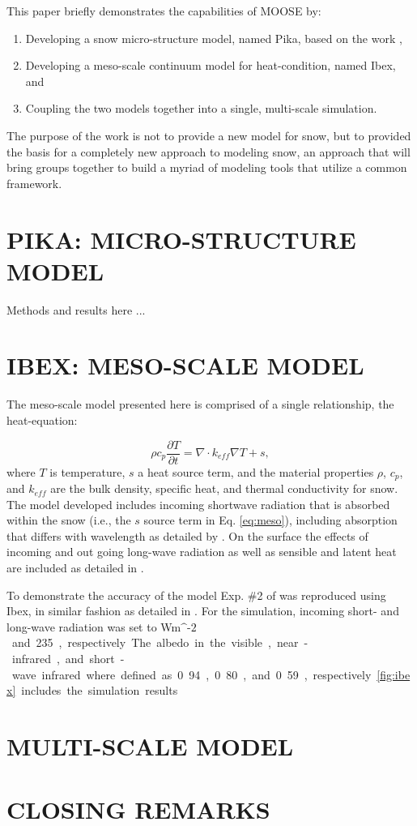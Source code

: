 This paper briefly demonstrates the capabilities of MOOSE by:
\begin{enumerate}
\item Developing a snow micro-structure model, named Pika, based on the work \citep{kaempfer2009phase},
\item Developing a meso-scale continuum model for heat-condition, named Ibex, and
\item Coupling the two models together into a single, multi-scale simulation.
\end{enumerate}

The purpose of the work is not to provide a new model for snow, but to provided the basis for a completely new approach to modeling snow, an approach that will bring groups together to build a myriad of modeling tools that utilize a common framework.

\section{PIKA: MICRO-STRUCTURE MODEL}\label{sec:pika}
Methods and results here ...

\section{IBEX: MESO-SCALE MODEL}\label{sec:ibex}
The meso-scale model presented here is comprised of a single relationship, the heat-equation:

\begin{equation}\label{eq:meso}
\rho c_p \frac{\partial{T}}{\partial t} = \nabla \cdot k_{eff} \nabla T + s,
\end{equation}
where $T$ is temperature, $s$ a heat source term, and the material properties $\rho$, $c_p$, and $k_{eff}$ are the bulk density, specific heat, and thermal conductivity for snow. The model developed includes incoming shortwave radiation that is absorbed within the snow (i.e., the $s$ source term in Eq. \eqref{eq:meso}), including absorption that differs with wavelength as detailed by \citet[][Ch. 4]{slaughter2010numerical}. On the surface the effects of incoming and out going long-wave radiation as well as sensible and latent heat are included as detailed in \citet{morstad2007experimental}.

To demonstrate the accuracy of the model Exp. \#2 of \citet{morstad2007experimental} was reproduced using Ibex, in similar fashion as detailed in \citet[][Ch. 4]{slaughter2010numerical}. For the simulation, incoming short- and long-wave radiation was set to \unit[650]{Wm$\textrm{^{-2}}$} and 235, respectively. The albedo in the visible, near-infrared, and short-wave infrared where defined as 0.94, 0.80, and 0.59, respectively. \ref{fig:ibex} includes the simulation results



\section{MULTI-SCALE MODEL}\label{sec:yeti}


\section{CLOSING REMARKS}
